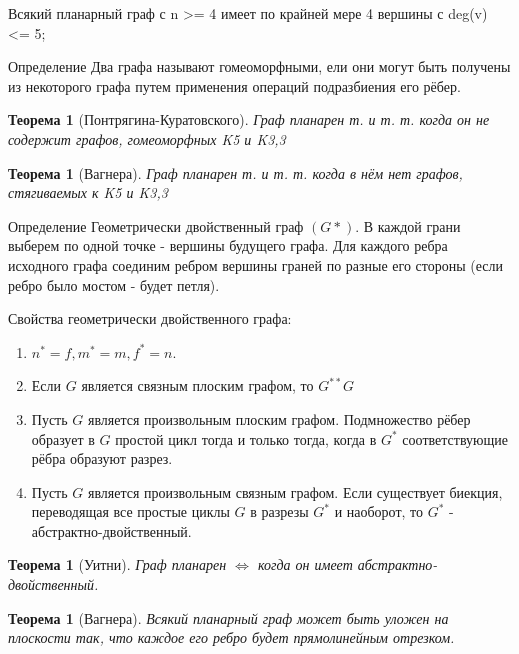 \documentclass[a4paper,openany]{book}
\newcounter{TheoremCounter}
\newtheorem{theorem}[TheoremCounter]{Теорема}
\newenvironment{definition}
{\begin{statement}{Определение}}
    {\end{statement}}
\begin{document}
\begin{stm}
  Всякий планарный граф с n >= 4 имеет по крайней мере 4 вершины с deg(v) <= 5;
\end{stm}

\begin{definition}
  Два графа называют гомеоморфными, ели они могут быть получены из некоторого
  графа путем применения операций подразбиения его рёбер.
\end{definition}

\begin{theorem}[Понтрягина-Куратовского]
Граф планарен т. и т. т. когда он не содержит графов, гомеоморфных K5 и K3,3
\end{theorem}

\begin{theorem}[Вагнера]
  Граф планарен т. и т. т. когда в нём нет графов, стягиваемых к K5 и K3,3
\end{theorem}

\begin{definition}
  Геометрически двойственный граф $(G*)$. В каждой грани выберем по одной точке -
  вершины будущего графа. Для каждого ребра исходного графа соединим ребром
  вершины граней по разные его стороны (если ребро было мостом - будет петля).
\end{definition}

Свойства геометрически двойственного графа:
\begin{enumerate}
  \item $n^* = f, m^* = m, f^* = n$.
  \item Если $G$ является связным плоским графом, то $G^{**} G$
  \item Пусть $G$ является произвольным плоским графом. Подмножество рёбер
  образует в $G$ простой цикл тогда и только тогда, когда в $G^*$
  соответствующие рёбра образуют разрез.
  \item Пусть $G$ является произвольным связным графом. Если существует биекция,
  переводящая все простые циклы $G$ в разрезы $G^*$ и наоборот, то $G^*$ -
  абстрактно-двойственный.
\end{enumerate}

\begin{theorem}[Уитни]
  Граф планарен $\Leftrightarrow$ когда он имеет абстрактно-двойственный.
\end{theorem}

\begin{theorem}[Вагнера]
  Всякий планарный граф может быть уложен на плоскости так, что каждое его
  ребро будет прямолинейным отрезком.
\end{theorem}
\end{document}

